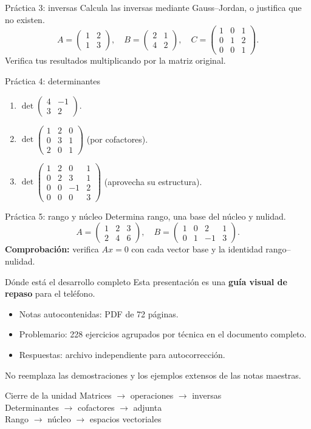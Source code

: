 \documentclass[aspectratio=169,11pt]{beamer}
\begin{document}
\begin{frame}{Práctica 3: inversas}
Calcula las inversas mediante Gauss--Jordan, o justifica que no existen.
\[A=\begin{pmatrix}1&2\\1&3\end{pmatrix},\quad B=\begin{pmatrix}2&1\\4&2\end{pmatrix},\quad C=\begin{pmatrix}1&0&1\\0&1&2\\0&0&1\end{pmatrix}.\]
Verifica tus resultados multiplicando por la matriz original.
\end{frame}
\begin{frame}{Práctica 4: determinantes}
\small
\begin{enumerate}\item $\det\begin{pmatrix}4&-1\\3&2\end{pmatrix}$.\item $\det\begin{pmatrix}1&2&0\\0&3&1\\2&0&1\end{pmatrix}$ (por cofactores).\item $\det\begin{pmatrix}1&2&0&1\\0&2&3&1\\0&0&-1&2\\0&0&0&3\end{pmatrix}$ (aprovecha su estructura).\end{enumerate}
\end{frame}
\begin{frame}{Práctica 5: rango y núcleo}
Determina rango, una base del núcleo y nulidad.
\[A=\begin{pmatrix}1&2&3\\2&4&6\end{pmatrix},\quad B=\begin{pmatrix}1&0&2&1\\0&1&-1&3\end{pmatrix}.\]
\textbf{Comprobación:} verifica $Ax=0$ con cada vector base y la identidad rango--nulidad.
\end{frame}
\begin{frame}{Dónde está el desarrollo completo}
Esta presentación es una \textbf{guía visual de repaso} para el teléfono.
\begin{itemize}\item Notas autocontenidas: PDF de 72 páginas.\item Problemario: 228 ejercicios agrupados por técnica en el documento completo.\item Respuestas: archivo independiente para autocorrección.\end{itemize}
No reemplaza las demostraciones y los ejemplos extensos de las notas maestras.
\end{frame}
\begin{frame}{Cierre de la unidad}
\centering\Large
Matrices $\longrightarrow$ operaciones $\longrightarrow$ inversas\\[1.4em]
Determinantes $\longrightarrow$ cofactores $\longrightarrow$ adjunta\\[1.4em]
Rango $\longrightarrow$ núcleo $\longrightarrow$ espacios vectoriales
\end{frame}
\end{document}
